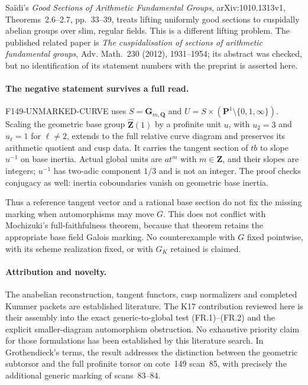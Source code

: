 Sa\"idi's \emph{Good Sections of Arithmetic Fundamental
Groups}, arXiv:1010.1313v1, Theorems~2.6--2.7,
pp.~33--39, treats lifting uniformly good sections to
cuspidally abelian groups over slim, regular fields.
This is a different lifting problem. The published related
paper is \emph{The cuspidalisation of sections of arithmetic
fundamental groups}, Adv. Math.~230 (2012), 1931--1954;
its abstract was checked, but no identification of its
statement numbers with the preprint is asserted here.

\paragraph{The negative statement survives a full read.}
F149-UNMARKED-CURVE uses
$S=\mathbf G_{m,\mathbf Q}$ and
$U=S\times(\mathbf P^1\setminus\{0,1,\infty\})$.
Scaling the geometric base group
$\widehat{\mathbf Z}(1)$ by a profinite unit $u$, with
$u_2=3$ and $u_\ell=1$ for $\ell\ne2$, extends to the
full relative curve diagram and preserves its arithmetic
quotient and cusp data. It carries the tangent section of
$t b$ to slope $u^{-1}$ on base inertia. Actual global units
are $a t^m$ with $m\in\mathbf Z$, and their slopes are
integers; $u^{-1}$ has two-adic component $1/3$ and is not
an integer. The proof checks conjugacy as well: inertia
coboundaries vanish on geometric base inertia.

Thus a reference tangent vector and a rational base section
do not fix the missing marking when automorphisms may move
$G$. This does not conflict with Mochizuki's full-faithfulness
theorem, because that theorem retains the appropriate base
field Galois marking. No counterexample with $G$ fixed
pointwise, with its scheme realization fixed, or with $G_K$
retained is claimed.

\paragraph{Attribution and novelty.}
The anabelian reconstruction, tangent functors, cusp
normalizers and completed Kummer packets are established
literature. The K17 contribution reviewed here is their
assembly into the exact generic-to-global test (FR.1)--(FR.2)
and the explicit smaller-diagram automorphism obstruction.
No exhaustive priority claim for those formulations has
been established by this literature search. In Grothendieck's
terms, the result addresses the distinction between the
geometric subtorsor and the full profinite torsor on
cote~149 scan~85, with precisely the additional generic
marking of scans~83--84.


